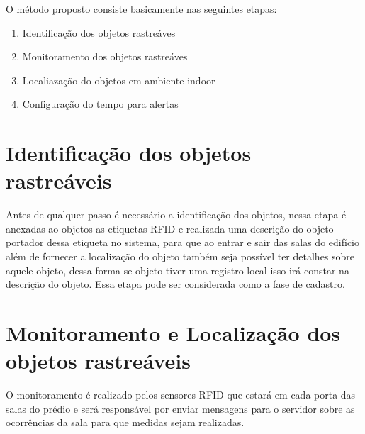 \par
O método proposto consiste basicamente nas seguintes etapas:
\begin{enumerate}
    \item Identificação dos objetos rastreáves
    \item Monitoramento dos objetos rastreáves
    \item Localiazação do objetos em ambiente indoor
    \item Configuração do tempo para alertas
\end{enumerate}
\section{Identificação dos objetos rastreáveis}
Antes de qualquer passo é necessário a identificação dos objetos, nessa etapa é anexadas ao objetos as etiquetas RFID e realizada uma descrição do objeto portador dessa etiqueta no sistema, para que ao entrar e sair das salas do edifício além de fornecer a localização do objeto também seja possível ter detalhes sobre aquele objeto, dessa forma se objeto tiver uma registro local isso irá constar na descrição do objeto. Essa etapa pode ser considerada como a fase de cadastro.

\section{Monitoramento e Localização dos objetos rastreáveis}
O monitoramento é realizado pelos sensores RFID que estará em cada porta das salas do prédio e será responsável por enviar mensagens para o servidor sobre as ocorrências da sala para que medidas sejam realizadas.
